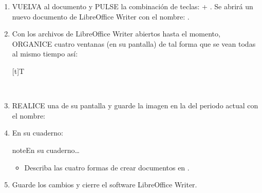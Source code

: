 \documentclass[letterpaper,10pt,spanish]{sphinxmanual}
\let\sphinxpxdimen\pdfpxdimen\else\newdimen\sphinxpxdimen
\begin{document}
\begin{enumerate}
\item {} 
\sphinxAtStartPar
VUELVA al documento  y PULSE la combinación de teclas:  + . Se abrirá un nuevo documento de LibreOffice Writer con el nombre: .

\item {} 
\sphinxAtStartPar
Con los archivos de LibreOffice Writer abiertos hasta el momento, ORGANICE cuatro ventanas (en su pantalla) de tal forma que se vean todas al mismo tiempo así:


\begin{savenotes}\sphinxattablestart
\sphinxthistablewithglobalstyle
\centering
\begin{tabulary}{\linewidth}[t]{T}
\sphinxtoprule
\sphinxtableatstartofbodyhook

\begin{sphinxfigure-in-table}
\centering
\capstart
\noindent\sphinxincludegraphics[width=700\sphinxpxdimen]{{image161}.png}
\label{\detokenize{1_guias/10ofimatica/G1013:id10}}\end{sphinxfigure-in-table}\relax
\\
\sphinxbottomrule
\end{tabulary}
\sphinxtableafterendhook\par
\sphinxattableend\end{savenotes}

\item {} 
\sphinxAtStartPar
REALICE una  de su pantalla y guarde la imagen en la  del periodo actual con el nombre: 

\item {} 
\sphinxAtStartPar
En su cuaderno:

\begin{sphinxadmonition}{note}{En su cuaderno…}
\begin{itemize}
\item {} 
\sphinxAtStartPar
Describa las cuatro formas de crear documentos en .

\end{itemize}
\end{sphinxadmonition}

\item {} 
\sphinxAtStartPar
Guarde los cambios y cierre el software LibreOffice Writer.

\end{enumerate}
\end{document}
